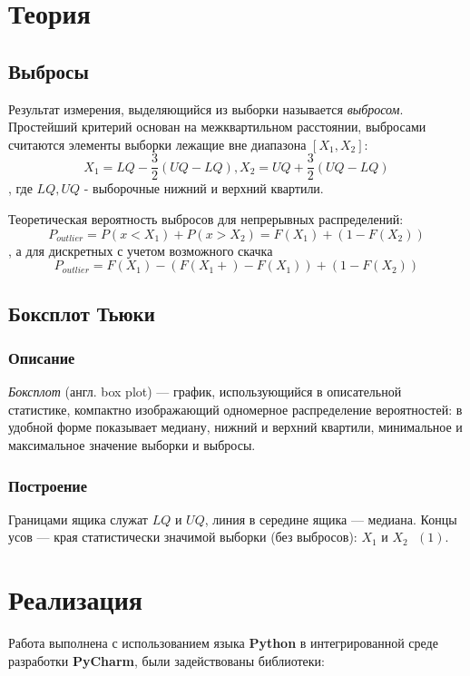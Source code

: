 \documentclass[12pt,a4paper]{article}
\begin{document}
\section{Теория}
\subsection{Выбросы}
Результат измерения, выделяющийся из выборки называется \textit{выбросом}. Простейший критерий основан на межквартильном расстоянии, выбросами считаются элементы выборки лежащие вне диапазона $[X_1, X_2]$:
\begin{equation}\label{1}
X_1=LQ - \frac{3}{2}(UQ-LQ), X_2=UQ + \frac{3}{2}(UQ-LQ)
\end{equation}, где $LQ, UQ$ - выборочные нижний и верхний квартили.

Теоретическая вероятность выбросов для непрерывных распределений:
\begin{equation}\label{2}
P_{outlier} = P(x<X_1) + P(x>X_2) = F(X_1) + (1 - F(X_2))
\end{equation}
, а для дискретных с учетом возможного скачка
\begin{equation}\label{3}
P_{outlier} = F(X_1) - (F(X_1+) - F(X_1)) + (1 - F(X_2))
\end{equation}

\subsection{Боксплот Тьюки}
\subsubsection{Описание}
\textit{Боксплот} (англ. box plot) — график, использующийся в описательной статистике, компактно изображающий одномерное распределение вероятностей: в удобной форме показывает медиану, нижний и верхний квартили, минимальное и максимальное значение выборки и выбросы.\cite{boxplot}

\subsubsection{Построение}
Границами ящика служат $LQ \text{ и } UQ$, линия в середине ящика — медиана. Концы усов — края статистически значимой выборки (без выбросов): $X_1 \text{ и } X_2 \text{ }\hyperref[1]{(1)}$.

\pagebreak

\section{Реализация}
\label{sec:impl}
Работа выполнена с использованием языка \textbf{Python} в интегрированной среде разработки \textbf{PyCharm}, были задействованы библиотеки:
\end{document}

